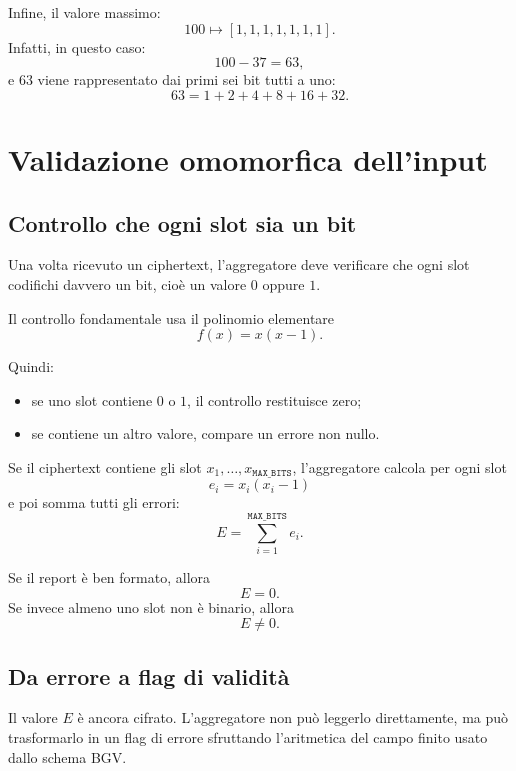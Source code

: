 Infine, il valore massimo:
\begin{equation}
100 \longmapsto [1,1,1,1,1,1,1].
\end{equation}
Infatti, in questo caso:
\begin{equation}
100 - 37 = 63,
\end{equation}
e $63$ viene rappresentato dai primi sei bit tutti a uno:
\begin{equation}
63 = 1 + 2 + 4 + 8 + 16 + 32.
\end{equation}

\section{Validazione omomorfica dell'input}
\subsection{Controllo che ogni slot sia un bit}
Una volta ricevuto un ciphertext, l'aggregatore deve verificare che ogni slot codifichi davvero un bit, cio\`e un valore $0$ oppure $1$.

Il controllo fondamentale usa il polinomio elementare
\begin{equation}
f(x) = x(x-1).
\end{equation}

Quindi:
\begin{itemize}
  \item se uno slot contiene $0$ o $1$, il controllo restituisce zero;
  \item se contiene un altro valore, compare un errore non nullo.
\end{itemize}

Se il ciphertext contiene gli slot $x_1,\dots,x_{\texttt{MAX\_BITS}}$, l'aggregatore calcola per ogni slot
\begin{equation}
e_i = x_i(x_i-1)
\end{equation}
e poi somma tutti gli errori:
\begin{equation}
E = \sum_{i=1}^{\texttt{MAX\_BITS}} e_i.
\end{equation}

Se il report \`e ben formato, allora
\begin{equation}
E = 0.
\end{equation}
Se invece almeno uno slot non \`e binario, allora
\begin{equation}
E \neq 0.
\end{equation}

\subsection{Da errore a flag di validit\`a}
Il valore $E$ \`e ancora cifrato. L'aggregatore non pu\`o leggerlo direttamente, ma pu\`o trasformarlo in un flag di errore sfruttando l'aritmetica del campo finito usato dallo schema BGV.

